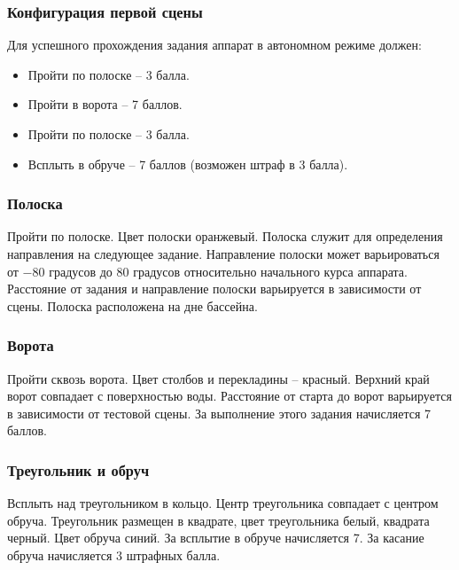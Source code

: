 
\subsubsection*{Конфигурация первой сцены}


Для успешного прохождения задания аппарат в автономном режиме
должен:

\begin{itemize}
    \item Пройти по полоске – 3 балла. 
    \item Пройти в ворота – 7 баллов.
    \item Пройти по полоске – 3 балла. 
    \item Всплыть в обруче – 7 баллов (возможен штраф в 3 балла).
\end{itemize}

\subsubsection*{Полоска}


Пройти по полоске. Цвет полоски оранжевый. Полоска служит для определения направления на следующее задание. Направление полоски может варьироваться от $-80$ градусов до $80$ градусов относительно начального курса аппарата. Расстояние от задания и направление полоски варьируется в зависимости от сцены. Полоска расположена на дне бассейна.

\subsubsection*{Ворота}


Пройти сквозь ворота. Цвет столбов и перекладины – красный. Верхний край ворот совпадает с поверхностью воды. Расстояние от старта до ворот варьируется в зависимости от тестовой сцены. За выполнение этого задания начисляется 7 баллов. 

\subsubsection*{Треугольник и обруч}


Всплыть над треугольником в кольцо. Центр треугольника совпадает с центром обруча. Треугольник размещен в квадрате, цвет треугольника белый, квадрата черный. Цвет обруча синий. За всплытие в обруче начисляется 7. За касание обруча начисляется 3 штрафных балла.

